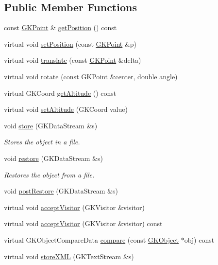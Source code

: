 \subsection*{Public Member Functions}
\begin{DoxyCompactItemize}
\item 
const \hyperlink{classGKPoint}{G\+K\+Point} \& \hyperlink{classGKDPoint_a93744bf162b5ea36d572a68433090ebe}{get\+Position} () const 
\item 
virtual void \hyperlink{classGKDPoint_a22f3dd78801702908e899ca1874f0a9b}{set\+Position} (const \hyperlink{classGKPoint}{G\+K\+Point} \&p)
\item 
virtual void \hyperlink{classGKDPoint_a6a55158b066bf07aab414ea8ef097a01}{translate} (const \hyperlink{classGKPoint}{G\+K\+Point} \&delta)
\item 
virtual void \hyperlink{classGKDPoint_a143039d0ae0e60288bc15000439c2e24}{rotate} (const \hyperlink{classGKPoint}{G\+K\+Point} \&center, double angle)
\item 
virtual G\+K\+Coord \hyperlink{classGKDPoint_a07b4a81c0a38724e5a3a9799fa877356}{get\+Altitude} () const 
\item 
virtual void \hyperlink{classGKDPoint_aadbf5a3105ea433e45b6d7368854cc22}{set\+Altitude} (G\+K\+Coord value)
\item 
void \hyperlink{classGKDPoint_a4dca6911aa558b7002801cfc2be10af0}{store} (G\+K\+Data\+Stream \&s)\hypertarget{classGKDPoint_a4dca6911aa558b7002801cfc2be10af0}{}\label{classGKDPoint_a4dca6911aa558b7002801cfc2be10af0}

\begin{DoxyCompactList}\small\item\em Stores the object in a file. \end{DoxyCompactList}\item 
void \hyperlink{classGKDPoint_aa10dedae2a3d877bd94b1b7bdbe7f0c1}{restore} (G\+K\+Data\+Stream \&s)\hypertarget{classGKDPoint_aa10dedae2a3d877bd94b1b7bdbe7f0c1}{}\label{classGKDPoint_aa10dedae2a3d877bd94b1b7bdbe7f0c1}

\begin{DoxyCompactList}\small\item\em Restores the object from a file. \end{DoxyCompactList}\item 
void \hyperlink{classGKDPoint_a43415f7118e37f8e495c5b484565902e}{post\+Restore} (G\+K\+Data\+Stream \&s)
\item 
virtual void \hyperlink{classGKDPoint_a72ec8ba93733d4dd9eea7ee0eed6ade5}{accept\+Visitor} (G\+K\+Visitor \&visitor)
\item 
virtual void \hyperlink{classGKDPoint_afa6a3ce0476ed68257e7864e701856dd}{accept\+Visitor} (G\+K\+Visitor \&visitor) const 
\item 
virtual G\+K\+Object\+Compare\+Data \hyperlink{classGKDPoint_a0dc57d1512d6eae6ffff4e3a4e2d3df5}{compare} (const \hyperlink{classGKObject}{G\+K\+Object} $\ast$obj) const 
\item 
virtual void \hyperlink{classGKDPoint_ab4d850cf7e7b89001b851f13ef1e292f}{store\+X\+ML} (G\+K\+Text\+Stream \&s)\hypertarget{classGKDPoint_ab4d850cf7e7b89001b851f13ef1e292f}{}\label{classGKDPoint_ab4d850cf7e7b89001b851f13ef1e292f}


\end{DoxyCompactItemize}
